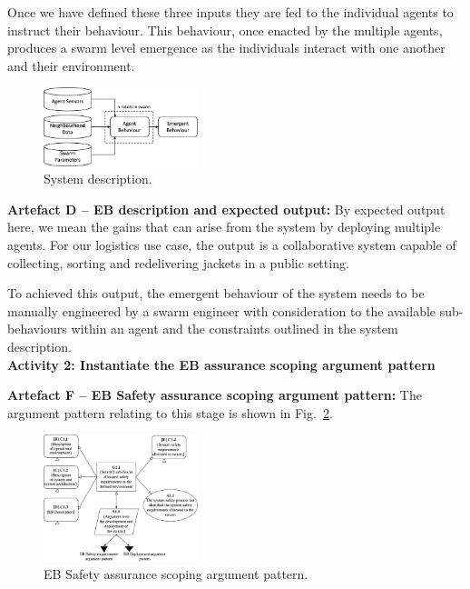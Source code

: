 \documentclass[lettersize,journal]{IEEEtran}
\begin{document}
Once we have defined these three inputs they are fed to the individual agents to instruct their behaviour. This behaviour, once enacted by the multiple agents, produces a swarm level emergence as the individuals interact with one another and their environment.

\begin{figure}
	\centering
	\includegraphics[width=0.4\textwidth]{figures/stage1-systema.png}
	\caption{System description.}
	\label{system-description}
\end{figure}

\noindent \textbf{Artefact D -- EB description and expected output: }
By expected output here, we mean the gains that can arise from the system by deploying multiple agents.
For our logistics use case, the output is a collaborative system capable of collecting, sorting and redelivering jackets in a public setting. 

To achieved this output, the emergent behaviour of the system needs to be manually engineered by a swarm engineer with consideration to the available sub-behaviours within an agent and the constraints outlined in the system description.\\
%

\noindent \textbf{Activity 2: Instantiate the EB assurance scoping argument pattern}

\noindent \textbf{Artefact F -- EB Safety assurance scoping argument pattern: }
The argument pattern relating to this stage is shown in Fig.~\ref{stage1-ap}. 
\begin{figure}
	\centering
	\includegraphics[width=0.4\textwidth]{figures/stage1-argumentpattern.png}
	\caption{EB Safety assurance scoping argument pattern.}
	\label{stage1-ap}
\end{figure}
\end{document}
